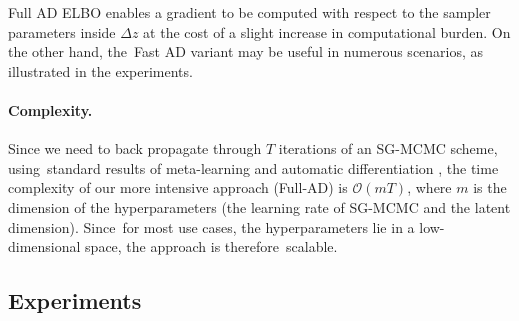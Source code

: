  Full AD ELBO enables a gradient to be computed
 with respect to the sampler parameters inside $\Delta z$ at the cost of a slight increase in computational burden.
 On the other hand, the~Fast AD variant may be useful in numerous scenarios, as illustrated in the experiments.

\paragraph{Complexity.} 
Since we need to back propagate through $T$ iterations of an SG-MCMC scheme, using~standard results of meta-learning and automatic differentiation \parencite{franceschi2017forward}, the time complexity of our more intensive approach (Full-AD) is $\mathcal{O}(mT)$, where $m$ is the dimension of the hyperparameters (the learning rate of SG-MCMC and the latent dimension). Since~for most use cases, the hyperparameters lie in a low-dimensional space, the approach is
therefore~scalable.















\subsection{Experiments}\label{sec:exps_vis}

